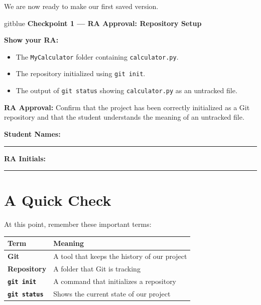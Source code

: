 \documentclass[11pt,a4paper]{article}
\begin{document}



We are now ready to make our first saved version.

\begin{checkpoint}{gitblue}
\textbf{Checkpoint 1 --- RA Approval: Repository Setup}

\textbf{Show your RA:}

\begin{itemize}
    \item The \texttt{MyCalculator} folder containing \texttt{calculator.py}.
    \item The repository initialized using \texttt{git init}.
    \item The output of \texttt{git status} showing \texttt{calculator.py} as an untracked file.
\end{itemize}

\textbf{RA Approval:} Confirm that the project has been correctly initialized as a Git repository and that the student understands the meaning of an untracked file.

\vspace{0.5em}

\textbf{Student Names:} \rule{5cm}{0.4pt} \textbf{RA Initials:} \rule{3cm}{0.4pt}
\end{checkpoint}

\section{A Quick Check}

At this point, remember these important terms:

\begin{center}
\begin{tabular}{>{\bfseries}p{3cm} p{9cm}}
\toprule
Term & Meaning\\
\midrule
Git & A tool that keeps the history of our project\\
Repository & A folder that Git is tracking\\
\texttt{git init} & A command that initializes a repository\\
\texttt{git status} & Shows the current state of our project\\
\bottomrule
\end{tabular}
\end{center}
\end{document}
